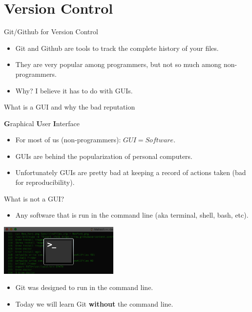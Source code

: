 \documentclass[ignorenonframetext,]{beamer}
\providecommand{\tightlist}{%
  \setlength{\itemsep}{0pt}\setlength{\parskip}{0pt}}
\begin{document}
\hypertarget{version-control}{%
\section{Version Control}\label{version-control}}

\begin{frame}{Git/Github for Version Control}
\protect\hypertarget{gitgithub-for-version-control}{}

\begin{itemize}
\item
  Git and Github are tools to track the complete history of your files.
\item
  They are very popular among programmers, but not so much among
  non-programmers.
\item
  Why? I believe it has to do with GUIs.
\end{itemize}

\end{frame}

\begin{frame}{What is a GUI and why the bad reputation}
\protect\hypertarget{what-is-a-gui-and-why-the-bad-reputation}{}

\textbf{G}raphical \textbf{U}ser \textbf{I}nterface

\begin{itemize}
\item
  For most of us (non-programmers): \(GUI = Software\).
\item
  GUIs are behind the popularization of personal computers.
\item
  Unfortunately GUIs are pretty bad at keeping a record of actions taken
  (bad for reproducibility).
\end{itemize}

\end{frame}

\begin{frame}{What is not a GUI?}
\protect\hypertarget{what-is-not-a-gui}{}

\begin{itemize}
\tightlist
\item
  Any software that is run in the command line (aka terminal, shell,
  bash, etc).
\end{itemize}

\centering

\includegraphics[height=1in]{../Images/command_line.png}

\begin{itemize}
\item
  Git was designed to run in the command line.
\item
  Today we will learn Git \textbf{without} the command line.
\end{itemize}

\end{frame}
\end{document}
